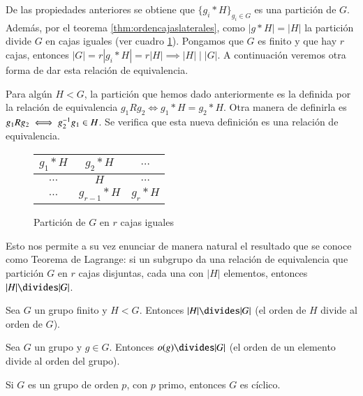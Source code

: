 De las propiedades anteriores se obtiene que $\{g_i \ast H\}_{g_i \in G}$ es una partición de $G$. Además, por el teorema \ref{thm:ordencajaslaterales}, como $|g \ast H| = |H|$ la partición divide $G$ en cajas iguales (ver cuadro \ref{table:cajasiguales}). Pongamos que $G$ es finito y que hay $r$ cajas, entonces $|G| = r|g_i \ast H| = r|H| \implies |H| \mid |G|$. A continuación veremos otra forma de dar esta relación de equivalencia.


Para algún $H < G$, la partición que hemos dado anteriormente es la definida por la relación de equivalencia $g_1 R g_2 \iff g_1 \ast H = g_2 \ast H$. Otra manera de definirla es $g_1 R g_2 \iff g_2^{-1}g_1 \in H$. Se verifica que esta nueva definición es una relación de equivalencia.

\begin{figure}[h]
	\centering
	\renewcommand{\arraystretch}{1.5}
	\begin{tabular}{|c|c|c|}
		\hline
		$g_1 \ast H$ & $g_2 \ast H$ & $\dots$ \\\hline
		$\dots$ & $H$ & $\dots$ \\\hline
		$\dots$ & $g_{r-1} \ast H$ & $g_r \ast H$\\\hline
	\end{tabular}
	\caption{Partición de $G$ en $r$ cajas iguales}
	\label{table:cajasiguales}
\end{figure}


Esto nos permite a su vez enunciar de manera natural el resultado que se conoce como Teorema de Lagrange: si un subgrupo da una relación de equivalencia que partición $G$ en $r$ cajas disjuntas, cada una con $|H|$ elementos, entonces $|H| \divides |G|$.

\begin{thm}[de Lagrange]
	\label{thm:lagrange}
	Sea $G$ un grupo finito y $H < G$. Entonces $|H| \divides |G| $ (el orden de $H$ divide al orden de $G$).
\end{thm}

\begin{cor}
	Sea $G$ un grupo y $g \in G$. Entonces $o(g) \divides |G|$ (el orden de un elemento divide al orden del grupo).
\end{cor}

\begin{cor}
	Si $G$ es un grupo de orden $p$, con $p$ primo, entonces $G$ es cíclico.
\end{cor}

